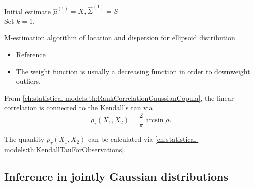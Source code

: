 \begin{refsection}
\begin{algorithm}[H][]\
	\SetAlgoLined
	
	Initial estimate $\hat{\mu}^(1) = \bar{X}, \hat{\Sigma}^{(1)} = S$.\\
	Set $k=1$.\\
	
	\KwOut{$\hat{\mu},\hat{\Sigma}$}
	\caption{M-estimation algorithm of location and dispersion for ellipsoid distribution}
\end{algorithm}

\begin{remark}\hfill
	\begin{itemize}
		\item Reference \cite[97]{mcneil2015quantitative}.
		\item The weight function is usually a decreasing function in order to downweight outliers.
	\end{itemize}	
	
\end{remark}



\begin{note}\cite[97]{mcneil2015quantitative}
	From \autoref{ch:statistical-models:th:RankCorrelationGaussianCopula}, the linear correlation is connected to the Kendall's tau via
	$$\rho_\tau(X_1,X_2) = \frac{2}{\pi} \arcsin \rho. $$
	
	The quantity $\rho_\tau(X_1,X_2)$ can be calculated via \autoref{ch:statistical-models:th:KendallTauForObservations}. 	
\end{note}

\subsection{Inference in jointly Gaussian distributions}


\end{refsection}
